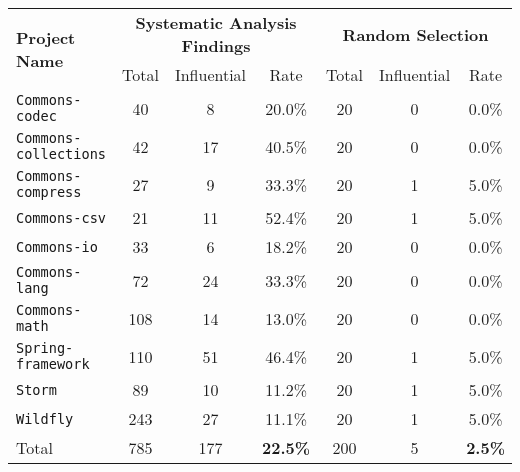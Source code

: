\centering
\resizebox{0.6\linewidth}{!}
{
\begin{tabular}{l c c c | c c  c}
  \multirow{2}{*}{\bf Project Name} & 
  \multicolumn{3}{c|}{\bf Systematic Analysis Findings} & 
  \multicolumn{3}{c}{\bf Random Selection} \\
  & Total & Influential & Rate & Total & Influential & Rate \\

\toprule

{\tt Commons-codec} & 40 & 8 & 20.0\% & 20 & 0 & 0.0\% \\
{\tt Commons-collections} & 42 & 17 & 40.5\% & 20 & 0 & 0.0\%\\
{\tt Commons-compress} & 27 & 9 & 33.3\% & 20 & 1 & 5.0\% \\
{\tt Commons-csv} & 21 & 11 & 52.4\% & 20 & 1 & 5.0\% \\
{\tt Commons-io} & 33 & 6 & 18.2\% & 20 & 0 & 0.0\%\\
{\tt Commons-lang} & 72 & 24 & 33.3\% &20 & 0 & 0.0\%\\
{\tt Commons-math} & 108 & 14 & 13.0\% &20 &  0 & 0.0\%\\
{\tt Spring-framework} & 110 & 51 & 46.4\% &  20 & 1& 5.0\%\\
{\tt Storm} & 89 & 10 & 11.2\% & 20 & 1 & 5.0\% \\
{\tt Wildfly} & 243 & 27 & 11.1\% & 20 & 1 & 5.0\% \\
\midrule
Total & 785 & 177 & {\bf 22.5\%} & 200 & 5 & {\bf 2.5\%}\\
\bottomrule

\end{tabular}}
